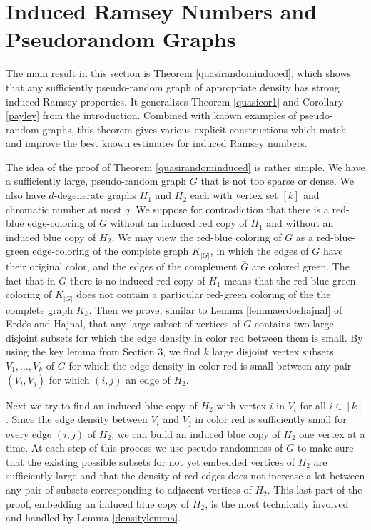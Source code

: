 \documentclass[11pt]{article}
\begin{document}
\section{Induced Ramsey Numbers and Pseudorandom Graphs} \label{moreoninduced}
The main result in this section is Theorem \ref{quasirandominduced},
which shows that any sufficiently pseudo-random graph of appropriate
density has strong induced Ramsey properties. It generalizes Theorem
\ref{quasicor1} and Corollary \ref{payley} from the introduction.
Combined with known examples of pseudo-random graphs, this theorem
gives various explicit constructions which match and improve the
best known estimates for induced Ramsey numbers.


The idea of the proof of Theorem \ref{quasirandominduced} is rather
simple. We have a sufficiently large, pseudo-random graph $G$ that
is not too sparse or dense. We also have $d$-degenerate graphs $H_1$
and $H_2$ each with vertex set $[k]$ and chromatic number at most
$q$. We suppose for contradiction that
there is a red-blue edge-coloring of $G$ without an induced red
copy of $H_1$ and without an induced blue copy
of $H_2$. We may view the red-blue coloring of $G$ as a
red-blue-green edge-coloring of the complete graph $K_{|G|}$, in
which the edges of $G$ have their original color, and the edges of
the complement $\bar G$ are colored green. The fact that in $G$
there is no induced red copy of $H_1$ means that the red-blue-green
coloring of $K_{|G|}$ does not contain a particular red-green
coloring of the the complete graph $K_k$. Then we prove, similar to
Lemma \ref{lemmaerdoshajnal} of Erd\H{o}s and Hajnal,  that any
large subset of vertices of $G$ contains two large disjoint subsets
for which the edge density in color red between them is small. By
using the key lemma from Section 3, we find $k$ large disjoint
vertex subsets $V_1,\ldots,V_k$ of $G$ for which the edge density in
color red is small between any pair $(V_i,V_j)$ for which $(i,j)$ an
edge of $H_2$.

Next we try to find an induced blue copy of $H_2$ with vertex $i$ in
$V_i$ for all $i \in [k]$. Since the edge density between $V_i$ and
$V_j$ in color red is sufficiently small for every edge $(i,j)$ of
$H_2$, we can build an induced blue copy of $H_2$ one vertex at a
time. At each step of this process we use pseudo-randomness of $G$
to make sure that the existing possible subsets for not yet embedded
vertices of $H_2$ are sufficiently large and that the density of red
edges does not increase a lot between any pair of subsets
corresponding to adjacent vertices of $H_2$. This last part of the
proof, embedding an induced blue copy of $H_2$, is the most
technically involved and handled by Lemma \ref{densitylemma}.
\end{document}
